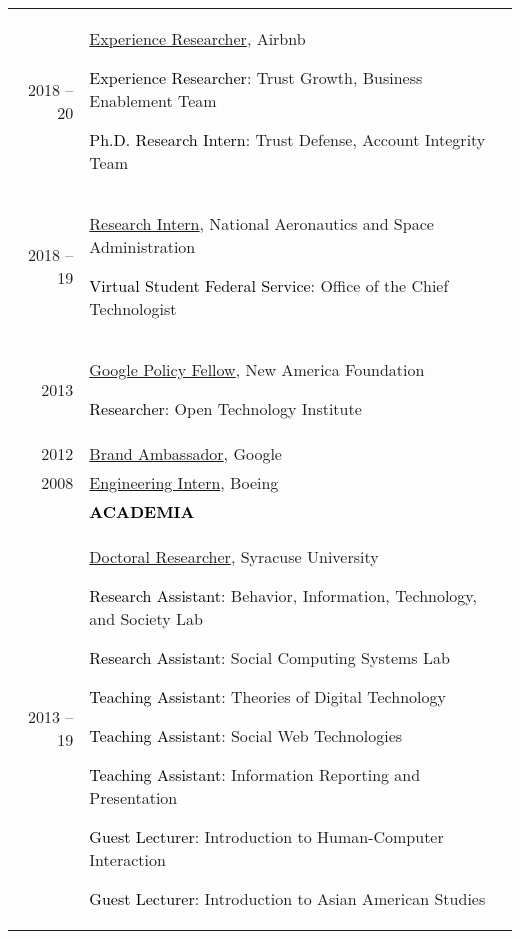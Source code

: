 \documentclass[11pt]{article}
\begin{document}
{{\begin{longtable}{Rp{0.75in}p{5.0in}}
\footnotesize{2018 -- 20} & \href{https://airbnb.com/}{Experience Researcher}, Airbnb \par \textcolor{black}{Experience Researcher}: Trust Growth, Business Enablement Team \par \textcolor{black}{Ph.D. Research Intern}: Trust Defense, Account Integrity Team\\

\footnotesize{2018 -- 19} & \href{https://vsfs.state.gov/about}{Research Intern}, National Aeronautics and Space Administration \par \textcolor{black}{Virtual Student Federal Service}: Office of the Chief Technologist\\

\footnotesize{2013} & \href{https://www.google.com/policyfellowship/2013fellows.html}{Google Policy Fellow}, New America Foundation \par \textcolor{black}{Researcher}: Open Technology Institute\\

\footnotesize{2012} & \href{https://students.googleblog.com/2012/09/a-new-class-of-google-student.html}{Brand Ambassador}, Google\\

\footnotesize{2008} & \href{https://www.engr.washington.edu/current/studentprogs/alva}{Engineering Intern}, Boeing\\

& \textcolor{black}{\uppercase{\textbf{Academia}}}\\

\footnotesize{2013 -- 19} & \href{https://ischool.syr.edu/research/research-centers/behavior-information-technology-and-society-bits-lab/}{Doctoral Researcher}, Syracuse University \par \textcolor{black}{Research Assistant}: Behavior, Information, Technology, and Society Lab \par \textcolor{black}{Research Assistant}: Social Computing Systems Lab \par \textcolor{black}{Teaching Assistant}: Theories of Digital Technology \par \textcolor{black}{Teaching Assistant}: Social Web Technologies \par \textcolor{black}{Teaching Assistant}: Information Reporting and Presentation \par \textcolor{black}{Guest Lecturer}: Introduction to Human-Computer Interaction \par \textcolor{black}{Guest Lecturer}: Introduction to Asian American Studies\\


\end{longtable}}}
\end{document}
